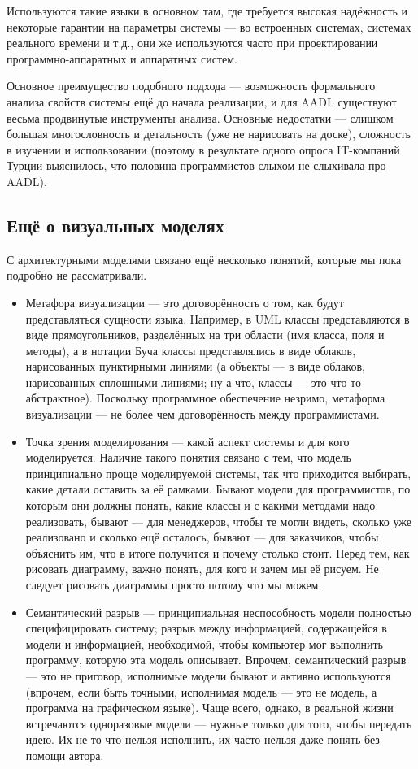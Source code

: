 \documentclass[a5paper]{article}
\begin{document}
Используются такие языки в основном там, где требуется высокая надёжность и некоторые гарантии на параметры системы --- во встроенных системах, системах реального времени и т.д., они же используются часто при проектировании программно-аппаратных и аппаратных систем.

Основное преимущество подобного подхода --- возможность формального анализа свойств системы ещё до начала реализации, и для AADL существуют весьма продвинутые инструменты анализа. Основные недостатки --- слишком большая многословность и детальность (уже не нарисовать на доске), сложность в изучении и использовании (поэтому в результате одного опроса IT-компаний Турции выяснилось, что половина программистов слыхом не слыхивала про AADL).

\subsection{Ещё о визуальных моделях}

С архитектурными моделями связано ещё несколько понятий, которые мы пока подробно не рассматривали.

\begin{itemize}
	\item Метафора визуализации --- это договорённость о том, как будут представляться сущности языка. Например, в UML классы представляются в виде прямоугольников, разделённых на три области (имя класса, поля и методы), а в нотации Буча классы представлялись в виде облаков, нарисованных пунктирными линиями (а объекты --- в виде облаков, нарисованных сплошными линиями; ну а что, классы --- это что-то абстрактное). Поскольку программное обеспечение незримо, метаформа визуализации --- не более чем договорённость между программистами.
	\item Точка зрения моделирования --- какой аспект системы и для кого моделируется. Наличие такого понятия связано с тем, что модель принципиально проще моделируемой системы, так что приходится выбирать, какие детали оставить за её рамками. Бывают модели для программистов, по которым они должны понять, какие классы и с какими методами надо реализовать, бывают --- для менеджеров, чтобы те могли видеть, сколько уже реализовано и сколько ещё осталось, бывают --- для заказчиков, чтобы объяснить им, что в итоге получится и почему столько стоит. Перед тем, как рисовать диаграмму, важно понять, для кого и зачем мы её рисуем. Не следует рисовать диаграммы просто потому что мы можем.
	\item Семантический разрыв --- принципиальная неспособность модели полностью специфицировать систему; разрыв между информацией, содержащейся в модели и информацией, необходимой, чтобы компьютер мог выполнить программу, которую эта модель описывает. Впрочем, семантический разрыв --- это не приговор, исполнимые модели бывают и активно используются (впрочем, если быть точными, исполнимая модель --- это не модель, а программа на графическом языке). Чаще всего, однако, в реальной жизни встречаются одноразовые модели --- нужные только для того, чтобы передать идею. Их не то что нельзя исполнить, их часто нельзя даже понять без помощи автора.
\end{itemize}
\end{document}
